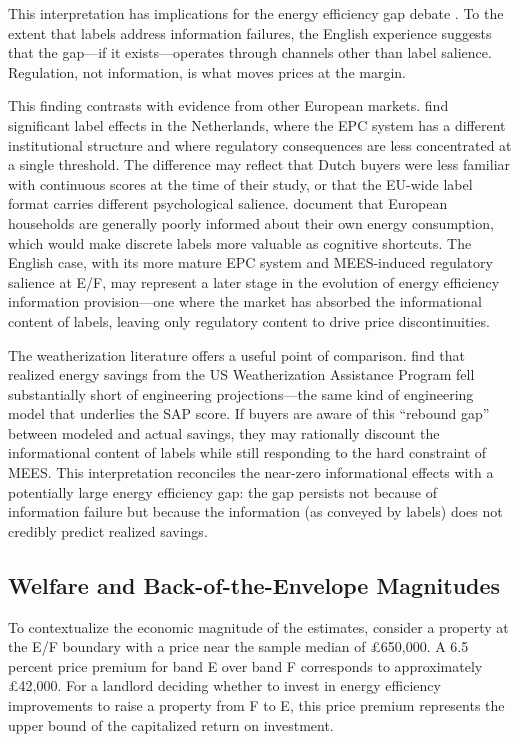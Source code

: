 \documentclass[12pt]{article}
\begin{document}
This interpretation has implications for the energy efficiency gap debate \citep{allcott2014consumers, gerarden2017assessing}. To the extent that labels address information failures, the English experience suggests that the gap---if it exists---operates through channels other than label salience. Regulation, not information, is what moves prices at the margin.

This finding contrasts with evidence from other European markets. \citet{aydin2020capitalization} find significant label effects in the Netherlands, where the EPC system has a different institutional structure and where regulatory consequences are less concentrated at a single threshold. The difference may reflect that Dutch buyers were less familiar with continuous scores at the time of their study, or that the EU-wide label format carries different psychological salience. \citet{brounen2011residential} document that European households are generally poorly informed about their own energy consumption, which would make discrete labels more valuable as cognitive shortcuts. The English case, with its more mature EPC system and MEES-induced regulatory salience at E/F, may represent a later stage in the evolution of energy efficiency information provision---one where the market has absorbed the informational content of labels, leaving only regulatory content to drive price discontinuities.

The weatherization literature offers a useful point of comparison. \citet{fowlie2018appliance} find that realized energy savings from the US Weatherization Assistance Program fell substantially short of engineering projections---the same kind of engineering model that underlies the SAP score. If buyers are aware of this ``rebound gap'' between modeled and actual savings, they may rationally discount the informational content of labels while still responding to the hard constraint of MEES. This interpretation reconciles the near-zero informational effects with a potentially large energy efficiency gap: the gap persists not because of information failure but because the information (as conveyed by labels) does not credibly predict realized savings.

\subsection{Welfare and Back-of-the-Envelope Magnitudes}

To contextualize the economic magnitude of the estimates, consider a property at the E/F boundary with a price near the sample median of \pounds 650,000. A 6.5 percent price premium for band E over band F corresponds to approximately \pounds 42,000. For a landlord deciding whether to invest in energy efficiency improvements to raise a property from F to E, this price premium represents the upper bound of the capitalized return on investment.
\end{document}
